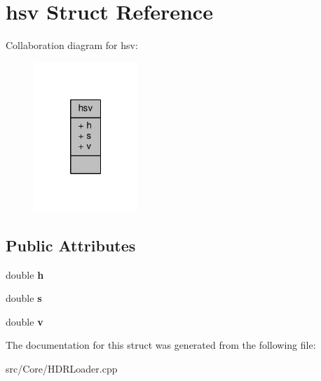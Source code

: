 \hypertarget{structhsv}{\section{hsv Struct Reference}
\label{structhsv}
}


Collaboration diagram for hsv\-:
\nopagebreak
\begin{figure}[H]
\begin{center}
\leavevmode
\includegraphics[width=112pt]{structhsv__coll__graph}
\end{center}
\end{figure}
\subsection*{Public Attributes}
\begin{DoxyCompactItemize}
\item 
\hypertarget{structhsv_aa27eea5f2a89b941eead7139330d12f4}{double {\bfseries h}}\label{structhsv_aa27eea5f2a89b941eead7139330d12f4}

\item 
\hypertarget{structhsv_a3cbdc4bf500068b5c4466c4272114a23}{double {\bfseries s}}\label{structhsv_a3cbdc4bf500068b5c4466c4272114a23}

\item 
\hypertarget{structhsv_a572c01d23590231adffe6f9b16df20d3}{double {\bfseries v}}\label{structhsv_a572c01d23590231adffe6f9b16df20d3}

\end{DoxyCompactItemize}


The documentation for this struct was generated from the following file\-:\begin{DoxyCompactItemize}
\item 
src/\-Core/H\-D\-R\-Loader.\-cpp\end{DoxyCompactItemize}
